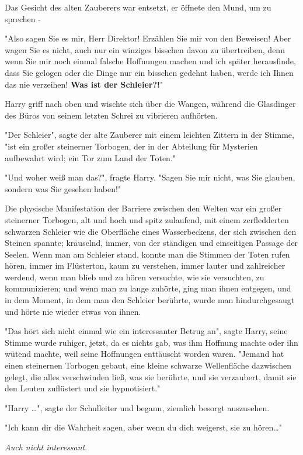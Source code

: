 {Das Gesicht des alten Zauberers war entsetzt, er öffnete den Mund, um zu sprechen -

"Also sagen Sie es mir, Herr Direktor! Erzählen Sie mir von den Beweisen! Aber wagen Sie es nicht, auch nur ein winziges bisschen davon zu übertreiben, denn wenn Sie mir noch einmal falsche Hoffnungen machen und ich später herausfinde, dass Sie gelogen oder die Dinge nur ein bisschen gedehnt haben, werde ich Ihnen das nie verzeihen! \textbf{Was ist der Schleier?!}"

Harry griff nach oben und wischte sich über die Wangen, während die Glasdinger des Büros von seinem letzten Schrei zu vibrieren aufhörten.

"Der Schleier", sagte der alte Zauberer mit einem leichten Zittern in der Stimme, "ist ein großer steinerner Torbogen, der in der Abteilung für Mysterien aufbewahrt wird; ein Tor zum Land der Toten."

"Und woher weiß man das?", fragte Harry. "Sagen Sie mir nicht, was Sie glauben, sondern was Sie gesehen haben!"

Die physische Manifestation der Barriere zwischen den Welten war ein großer steinerner Torbogen, alt und hoch und spitz zulaufend, mit einem zerfledderten schwarzen Schleier wie die Oberfläche eines Wasserbeckens, der sich zwischen den Steinen spannte; kräuselnd, immer, von der ständigen und einseitigen Passage der Seelen. Wenn man am Schleier stand, konnte man die Stimmen der Toten rufen hören, immer im Flüsterton, kaum zu verstehen, immer lauter und zahlreicher werdend, wenn man blieb und zu hören versuchte, wie sie versuchten, zu kommunizieren; und wenn man zu lange zuhörte, ging man ihnen entgegen, und in dem Moment, in dem man den Schleier berührte, wurde man hindurchgesaugt und hörte nie wieder etwas von ihnen.

"Das hört sich nicht einmal wie ein interessanter Betrug an", sagte Harry, seine Stimme wurde ruhiger, jetzt, da es nichts gab, was ihm Hoffnung machte oder ihn wütend machte, weil seine Hoffnungen enttäuscht worden waren. "Jemand hat einen steinernen Torbogen gebaut, eine kleine schwarze Wellenfläche dazwischen gelegt, die alles verschwinden ließ, was sie berührte, und sie verzaubert, damit sie den Leuten zuflüstert und sie hypnotisiert."

"Harry …", sagte der Schulleiter und begann, ziemlich besorgt auszusehen.

"Ich kann dir die Wahrheit sagen, aber wenn du dich weigerst, sie zu hören…"

\emph{Auch nicht interessant}.

}
